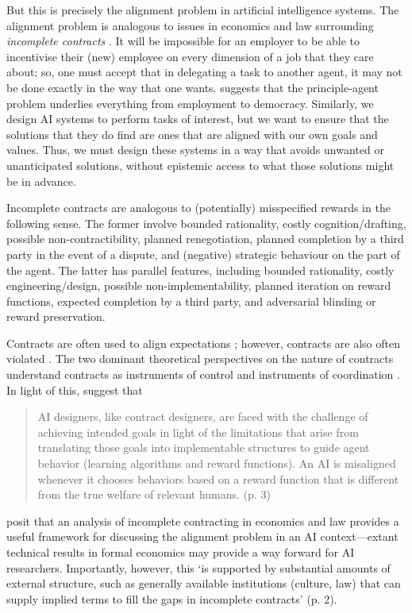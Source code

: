 \documentclass{amsart}
\theoremstyle{indented}
\theoremstyle{indentedProp}
\theoremstyle{indented}
\theoremstyle{indented}
\theoremstyle{indented}
\theoremstyle{indented}
\theoremstyle{indented}
\begin{document}
But this is precisely the alignment problem in artificial intelligence systems. The alignment problem is analogous to issues in economics and law surrounding {\it incomplete contracts} \citep{Hadfield-Menell-Hadfield-2019}. It will be impossible for an employer to be able to incentivise their (new) employee on every dimension of a job that they care about; so, one must accept that in delegating a task to another agent, it may not be done exactly in the way that one wants. \citet{Hadfield-2019} suggests that the principle-agent problem underlies everything from employment to democracy. Similarly, we design AI systems to perform tasks of interest, but we want to ensure that the solutions that they do find are ones that are aligned with our own goals and values. Thus, we must design these systems in a way that avoids unwanted or unanticipated solutions, without epistemic access to what those solutions might be in advance. 

Incomplete contracts are analogous to (potentially) misspecified rewards in the following sense. The former involve bounded rationality, costly cognition/drafting, possible non-contractibility, planned renegotiation, planned completion by a third party in the event of a dispute, and (negative) strategic behaviour on the part of the agent. The latter has parallel features, including bounded rationality, costly engineering/design, possible non-implementability, planned iteration on reward functions, expected completion by a third party, and adversarial blinding or reward preservation.

Contracts are often used to align expectations \citep{Macaulay-1963, Argyres-et-al-2007}; however, contracts are also often violated \citep{Robinson-Rousseau-1994}. The two dominant theoretical perspectives on the nature of contracts understand contracts as instruments of control \citep{Macneil-1977, Williamson-1985, Williamson-1991} and instruments of coordination \citep{Argyres-et-al-2007, Mayer-Argyres-2004}. In light of this, \citet{Hadfield-Menell-Hadfield-2019} suggest that 
\begin{quote}
    AI designers, like contract designers, are faced with the challenge of achieving intended goals in light of the limitations that arise from translating those goals into implementable structures to guide agent behavior (learning algorithms and reward functions). An AI is misaligned whenever it chooses behaviors based on a reward function that is different from the true welfare of relevant humans. (p. 3)
\end{quote}
\citet{Hadfield-Menell-Hadfield-2019} posit that an analysis of incomplete contracting in economics and law provides a useful framework for discussing the alignment problem in an AI context---extant technical results in formal economics may provide a way forward for AI researchers. Importantly, however, this `is supported by substantial amounts of external structure, such as generally available institutions (culture, law) that can supply implied terms to fill the gaps in incomplete contracts' (p. 2).  
\end{document}
